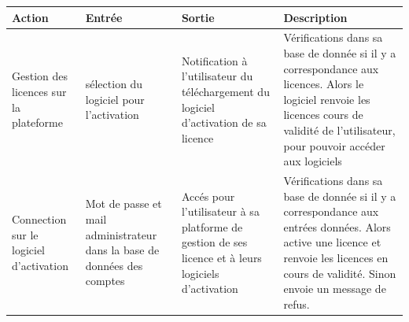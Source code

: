 \begin{table}[!ht] %
	\begin{tabular}{ | m{3cm} | m{3cm} | m{3cm} | m{6cm} | } 
		\hline
		\textbf{Action} & \textbf{Entrée} & \textbf{Sortie} & \textbf{Description} \\
		\hline
			Gestion des licences sur \newline la plateforme & sélection du logiciel pour l'activation & Notification à l'utilisateur du téléchargement du logiciel d'activation de sa licence & Vérifications dans sa base de donnée si il y a correspondance
			aux licences. Alors le logiciel renvoie les licences 
			cours de validité de l'utilisateur, pour pouvoir accéder aux logiciels \\ 
		\hline
			Connection sur \newline le logiciel \newline d'activation &  Mot de passe et mail administrateur dans la base de données des comptes & Accés pour l'utilisateur à sa platforme de gestion de ses licence et à leurs logiciels d'activation & Vérifications dans sa base de donnée si il y a correspondance
			aux entrées données. Alors active une licence et 
			renvoie les licences en cours de validité. Sinon envoie un message de refus. \\ 
		\hline		    
	\end{tabular}
\end{table}
